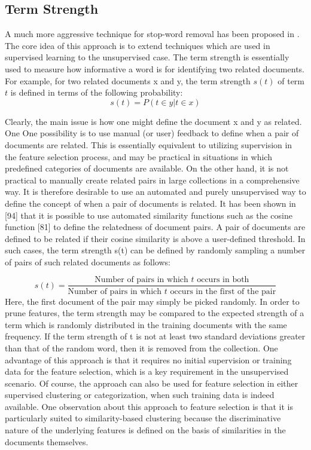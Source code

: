 \subsection{Term Strength}
A much more aggressive technique for stop-word removal has been proposed in \cite{Wilbur1992}. The core idea of this approach
is to extend techniques which are used in supervised learning to the unsupervised case. The term strength is essentially used to measure how informative a word is for identifying two related documents. For example, for two related documents x and y, the term strength $s(t)$ of term $t$ is defined in terms of the following probability:
\[
    s(t) = P(t \in y | t \in x)
    \label{eq:probTermStrength} \tag{233}
\]

Clearly, the main issue is how one might define the document x and y as related. One One possibility is to use manual (or user) feedback to define when a pair of documents are related. This is essentially equivalent to utilizing supervision in the feature selection process, and may be practical in situations in which predefined categories of documents are available. On the other hand, it is not practical to manually create related pairs in large collections in a comprehensive way. It is therefore desirable to use an automated and purely unsupervised way to define the concept of when a pair of documents is related. It has been shown in [94] that it is possible to use automated similarity functions such as the cosine function [81] to define the relatedness of document pairs. A pair of documents are defined to be related if their cosine similarity is above a user-defined threshold. In such cases, the term strength s(t) can be defined by randomly sampling a number of pairs of such related documents as follows:

\[
s(t) = \frac{\text{Number of pairs in which $t$ occurs in both}} {\text{Number of pairs in which $t$ occurs in the first of the pair}}
\label{eq:samplingpairs} \tag{234}
\]
Here, the first document of the pair may simply be picked randomly. In order to prune features, the term strength may be compared to the expected strength of a term which is randomly distributed in the training documents with the same frequency. If the term strength of t is not at least two standard deviations greater than that of the random word, then it is removed from the collection.
One advantage of this approach is that it requires no initial supervision or training data for the feature selection, which is a key requirement in the unsupervised scenario. Of course, the approach can also be used for feature selection in either supervised clustering \cite{Bobadilla2013} or categorization\cite{Salakhutdinov2007}, when such training data is indeed available. One observation about this approach to feature selection is that it is particularly suited to similarity-based clustering because the discriminative nature of the underlying features is defined on the basis of similarities in the documents themselves.

